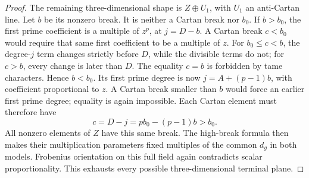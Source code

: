 \begin{proof}
The remaining three-dimensional shape is \(Z\oplus U_1\), with
\(U_1\) an anti-Cartan line. Let \(b\) be its nonzero break.
It is neither a Cartan break nor \(b_0\). If \(b>b_0\), the first
prime coefficient is a multiple of \(z^p\), at \(j=D-b\).
A Cartan break \(c<b_0\) would require that same first coefficient
to be a multiple of \(z\). For \(b_0\le c<b\), the degree-\(j\)
term changes strictly before \(D\), while the divisible terms
do not; for \(c>b\), every change is later than \(D\).
The equality \(c=b\) is forbidden by tame characters. Hence
\(b<b_0\). Its first prime degree is now \(j=A+(p-1)b\), with
coefficient proportional to \(z\). A Cartan break smaller than
\(b\) would force an earlier first prime degree; equality is
again impossible. Each Cartan element must therefore have
\[
                      c=D-j=pb_0-(p-1)b>b_0.
\]
All nonzero elements of \(Z\) have this same break. The high-break
formula then makes their multiplication parameters fixed multiples
of the common \(d_g\) in both models. Frobenius orientation on
this full field again contradicts scalar proportionality. This
exhausts every possible three-dimensional terminal plane.
\end{proof}

